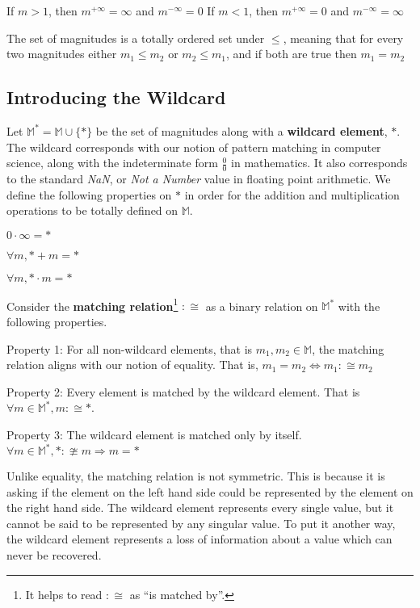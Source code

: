 \documentclass[twoside]{article}
\newcommand{\quotes}[1]{``#1''}
\begin{document}
If \(m > 1\), then \(m^{+\infty} = \infty\) and \(m^{-\infty} = 0\)
If \(m < 1\), then \(m^{+\infty} = 0\) and \(m^{-\infty} = \infty\)

The set of magnitudes is a totally ordered set under \(\leq\), meaning that for every two magnitudes either \(m_1 \leq m_2\) or \(m_2 \leq m_1\), and if both are true then \(m_1 = m_2\)

\subsection{Introducing the Wildcard}

Let \(\mathbb{M}^* = \mathbb{M} \cup \{\ast\}\) be the set of magnitudes along with a \textbf{wildcard element}, \(\ast\). The wildcard corresponds with our notion of pattern matching in computer science, along with the indeterminate form \(\frac{0}{0}\) in mathematics. It also corresponds to the standard \textit{NaN}, or \textit{Not a Number} value in floating point arithmetic. We define the following properties on \(\ast\) in order for the addition and multiplication operations to be totally defined on \(\mathbb{M}\).

\(0 \cdot \infty = \ast\)

\(\forall m,\ast + m = \ast\)

\(\forall m,\ast \cdot m = \ast\)

Consider the \textbf{matching relation}\footnote{It helps to read \(:\cong\) as \quotes{is matched by}.} \(:\cong\) as a binary relation on \(\mathbb{M}^*\) with the following properties.

Property 1: For all non-wildcard elements, that is \(m_1, m_2 \in \mathbb{M}\), the matching relation aligns with our notion of equality. That is, \(m_1 = m_2  \Leftrightarrow m_1 :\cong m_2 \)

Property 2: Every element is matched by the wildcard element. That is \(\forall m \in \mathbb{M}^*, m :\cong \ast\).

Property 3: The wildcard element is matched only by itself. \(\forall m \in \mathbb{M}^*, \ast :\ncong m \Rightarrow m = \ast\)

Unlike equality, the matching relation is not symmetric. This is because it is asking if the element on the left hand side could be represented by the element on the right hand side. The wildcard element represents every single value, but it cannot be said to be represented by any singular value. To put it another way, the wildcard element represents a loss of information about a value which can never be recovered.
\end{document}
